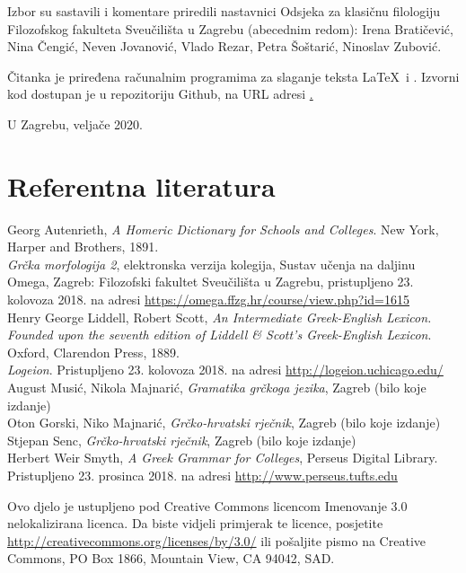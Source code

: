 \documentclass[a4paper,12pt,twoside]{report}
\begin{document}
Izbor su sastavili i komentare priredili nastavnici Odsjeka za klasičnu filologiju Filozofskog fakulteta Sveučilišta u Zagrebu (abecednim redom): Irena Bratičević, Nina Čengić, Neven Jovanović, Vlado Rezar, Petra Šoštarić, Ninoslav Zubović.

Čitanka je priređena računalnim programima za slaganje teksta \LaTeX\ i \XeLaTeX. Izvorni kod dostupan je u repozitoriju Github, na URL adresi \href{https://github.com/nevenjovanovic/grcka-morfologija}.

\medskip

U Zagrebu, veljače 2020.

\section*{Referentna literatura}

Georg Autenrieth, \textit{A Homeric Dictionary for Schools and Colleges}. New York, Harper and Brothers, 1891.\\
\textit{Grčka morfologija 2}, elektronska verzija kolegija, Sustav učenja na daljinu Omega, Zagreb: Filozofski fakultet Sveučilišta u Zagrebu, pristupljeno 23. kolovoza 2018. na adresi \url{https://omega.ffzg.hr/course/view.php?id=1615}\\
Henry George Liddell, Robert Scott, \textit{An Intermediate Greek-English Lexicon. Founded upon the seventh edition of Liddell \& Scott's Greek-English Lexicon}. Oxford, Clarendon Press, 1889.\\
\textit{Logeion}. Pristupljeno 23. kolovoza 2018. na adresi \url{http://logeion.uchicago.edu/}\\
August Musić, Nikola Majnarić, \textit{Gramatika grčkoga jezika}, Zagreb (bilo koje izdanje)\\
Oton Gorski, Niko Majnarić, \textit{Grčko-hrvatski rječnik}, Zagreb (bilo koje izdanje)\\
Stjepan Senc, \textit{Grčko-hrvatski rječnik}, Zagreb (bilo koje izdanje)\\
Herbert Weir Smyth, \textit{A Greek Grammar for Colleges}, Perseus Digital Library. Pristupljeno 23. prosinca 2018. na adresi \url{http://www.perseus.tufts.edu}\\


\vspace*{\fill}

\noindent Ovo djelo je ustupljeno pod Creative Commons licencom Imenovanje 3.0 nelokalizirana licenca. Da biste vidjeli primjerak te licence, posjetite \url{http://creativecommons.org/licenses/by/3.0/} ili pošaljite pismo na Creative Commons, PO Box 1866, Mountain View, CA 94042, SAD.
\end{document}
